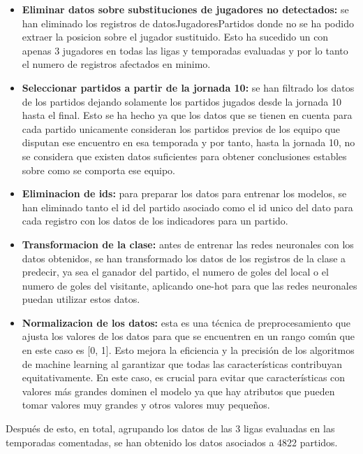 \begin{itemize}
    \item \textbf{Eliminar datos sobre substituciones de jugadores no detectados:} se han eliminado los registros de datosJugadoresPartidos donde no se ha podido extraer la posicion sobre el jugador sustituido. Esto ha sucedido un con apenas 3 jugadores en todas las ligas y temporadas evaluadas y por lo tanto el numero de registros afectados en minimo.
    \item \textbf{Seleccionar partidos a partir de la jornada 10:} se han filtrado los datos de los partidos dejando solamente los partidos jugados desde la jornada 10 hasta el final. Esto se ha hecho ya que los datos que se tienen en cuenta para cada partido unicamente consideran los partidos previos de los equipo que disputan ese encuentro en esa temporada y por tanto, hasta la jornada 10, no se considera que existen datos suficientes para obtener conclusiones estables sobre como se comporta ese equipo.
    \item \textbf{Eliminacion de ids:} para preparar los datos para entrenar los modelos, se han eliminado tanto el id del partido asociado como el id unico del dato para cada registro con los datos de los indicadores para un partido.
    \item \textbf{Transformacion de la clase:} antes de entrenar las redes neuronales con los datos obtenidos, se han transformado los datos de los registros de la clase a predecir, ya sea el ganador del partido, el numero de goles del local o el numero de goles del visitante, aplicando one-hot para que las redes neuronales puedan utilizar estos datos.
    \item \textbf{Normalizacion de los datos:} esta es una técnica de preprocesamiento que ajusta los valores de los datos para que se encuentren en un rango común que en este caso es [0, 1]. Esto mejora la eficiencia y la precisión de los algoritmos de machine learning al garantizar que todas las características contribuyan equitativamente. En este caso, es crucial para evitar que características con valores más grandes dominen el modelo ya que hay atributos que pueden tomar valores muy grandes y otros valores muy pequeños.

\end{itemize}

Después de esto, en total, agrupando los datos de las 3 ligas evaluadas en las temporadas 
comentadas, se han obtenido los datos asociados a 4822 partidos. 

